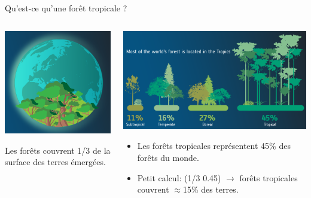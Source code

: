 \documentclass[10pt,table,dvipsnames,compress]{beamer}
\begin{document}
\begin{frame}[label={sec:org4324910}]{Qu'est-ce qu'une forêt tropicale ?}
\begin{columns}
\begin{column}{0.3\columnwidth}
\begin{center}
\includegraphics[width=\textwidth]{figs/forest-one-third-of-earth-land.png}
\end{center}
Les forêts couvrent 1/3 de la surface des terres émergées.
\end{column}
\begin{column}{0.7\columnwidth}
\begin{center}
\includegraphics[width=\textwidth]{figs/45-percent-of-forest-cover-in-the-tropics.png}
\end{center}
\begin{itemize}
\item Les forêts tropicales représentent 45\% des forêts du monde.
\item Petit calcul: (1/3 \texttimes{} 0.45) \(\rightarrow\) forêts tropicales couvrent \(\approx\)15\% des terres.
\end{itemize}
\end{column}
\end{columns}
\end{frame}
\end{document}

